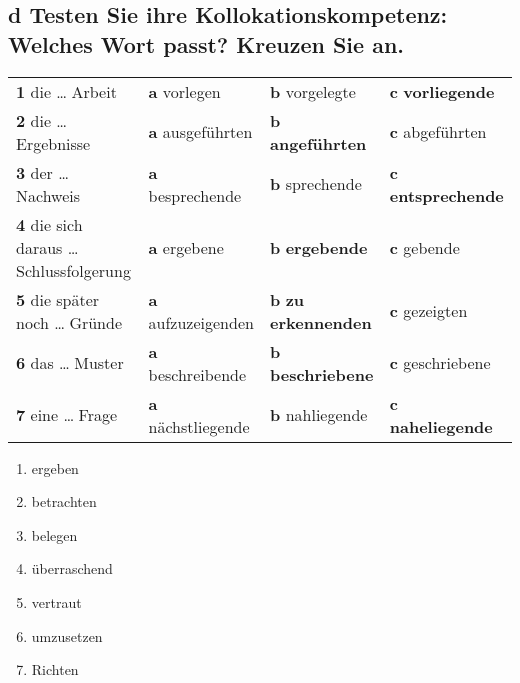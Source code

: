 \documentclass{article}
\begin{document}
	\subsection*{\textbf{d} Testen Sie ihre Kollokationskompetenz: Welches Wort passt? Kreuzen Sie an.}
	\begin{tabular}{ l  l  l  l }
		\textbf{1} die \dots $\;$Arbeit & \textbf{a} vorlegen & \textbf{b} vorgelegte & \textbf{c} \textbf{vorliegende} \\
		\textbf{2} die \dots $\;$Ergebnisse & \textbf{a} ausgeführten & \textbf{b} \textbf{angeführten} & \textbf{c} abgeführten \\
		\textbf{3} der \dots $\;$Nachweis & \textbf{a} besprechende & \textbf{b} sprechende & \textbf{c} \textbf{entsprechende} \\
		\textbf{4} die sich daraus \dots $\;$Schlussfolgerung & \textbf{a} ergebene & \textbf{b} \textbf{ergebende} & \textbf{c} gebende \\
		\textbf{5} die später noch \dots $\;$Gründe & \textbf{a} aufzuzeigenden & \textbf{b} \textbf{zu erkennenden} & \textbf{c} gezeigten \\
		\textbf{6} das \dots $\;$Muster & \textbf{a} beschreibende & \textbf{b} \textbf{beschriebene} & \textbf{c} geschriebene \\
		\textbf{7} eine \dots $\;$Frage & \textbf{a} nächstliegende & \textbf{b} nahliegende & \textbf{c} \textbf{naheliegende} \\
	\end{tabular}
	\begin{enumerate}
		\item{ergeben}
		\item{betrachten}
		\item{belegen}
		\item{überraschend}
		\item{vertraut}
		\item{umzusetzen}
		\item{Richten}
	\end{enumerate}
\end{document}
